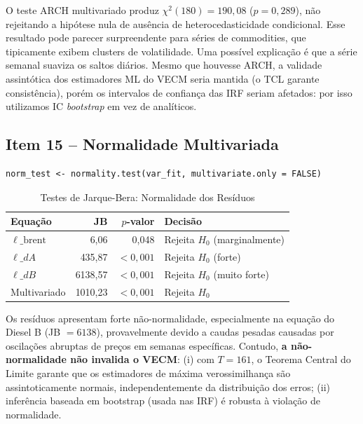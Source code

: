 \documentclass[12pt,a4paper]{article}
\begin{document}
\noindent
O teste ARCH multivariado produz $\chi^2(180) = 190{,}08$ ($p = 0{,}289$),
não rejeitando a hipótese nula de ausência de heterocedasticidade condicional.
Esse resultado pode parecer surpreendente para séries de commodities,
que tipicamente exibem clusters de volatilidade.
Uma possível explicação é que a série semanal suaviza os saltos diários.
Mesmo que houvesse ARCH, a validade assintótica dos estimadores ML
do VECM seria mantida (o TCL garante consistência), porém os intervalos
de confiança das IRF seriam afetados: por isso utilizamos IC \emph{bootstrap}
em vez de analíticos.

\subsection{Item 15 -- Normalidade Multivariada}

\begin{lstlisting}[caption={Teste de Jarque-Bera por equação e multivariado}]
norm_test <- normality.test(var_fit, multivariate.only = FALSE)
\end{lstlisting}

\begin{table}[H]
\centering
\caption{Testes de Jarque-Bera: Normalidade dos Resíduos}
\label{tab:norm}
\begin{tabular}{lrrl}
\toprule
Equação & JB & $p$-valor & Decisão \\
\midrule
$\ell\_\text{brent}$ & 6,06 & 0,048 & Rejeita $H_0$ (marginalmente) \\
$\ell\_dA$           & 435,87 & $< 0{,}001$ & Rejeita $H_0$ (forte) \\
$\ell\_dB$           & 6138,57 & $< 0{,}001$ & Rejeita $H_0$ (muito forte) \\
\midrule
Multivariado & 1010,23 & $< 0{,}001$ & Rejeita $H_0$ \\
\bottomrule
\end{tabular}
\end{table}

\noindent
Os resíduos apresentam forte não-normalidade, especialmente na equação
do Diesel B (JB $= 6138$), provavelmente devido a caudas pesadas
causadas por oscilações abruptas de preços em semanas específicas.
Contudo, \textbf{a não-normalidade não invalida o VECM}:
(i) com $T = 161$, o Teorema Central do Limite garante que os estimadores
de máxima verossimilhança são assintoticamente normais, independentemente
da distribuição dos erros; (ii) inferência baseada em bootstrap
(usada nas IRF) é robusta à violação de normalidade.
\end{document}
